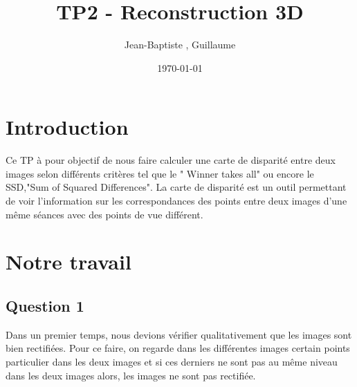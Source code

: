 \documentclass[12pt]{report}
\title{TP2 - Reconstruction 3D}
\author{Jean-Baptiste \bsc{Morice}, Guillaume \bsc{Versal}}
\date{\today}
\begin{document}
\maketitle

\tableofcontents

\newpage
\section*{Introduction}

Ce TP à pour objectif de nous faire calculer une carte de disparité entre deux images selon différents critères tel que le " Winner takes all" ou encore le SSD,"Sum of Squared Differences". La carte de disparité est un outil permettant de voir l'information sur les correspondances des points entre deux images d'une même séances avec des points de vue différent.

\section{Notre travail}

\subsection*{Question 1}

Dans un premier temps, nous devions vérifier qualitativement que les images sont bien rectifiées. Pour ce faire, on regarde dans les différentes images certain points particulier dans les deux images et si ces derniers ne sont pas au même niveau dans les deux images alors, les images ne sont pas rectifiée.
\end{document}
